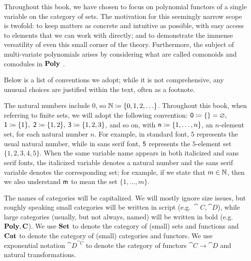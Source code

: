 \documentclass[Book-Poly]{subfiles}
\begin{document}
Throughout this book, we have chosen to focus on polynomial functors of a single variable on the category of sets.
The motivation for this seemingly narrow scope is twofold: to keep matters as concrete and intuitive as possible, with easy access to elements that we can work with directly; and to demonstrate the immense versatility of even this small corner of the theory. Furthermore, the subject of multi-variate polynomials arises by considering what are called comonoids and comodules in $\mathbf{Poly}$ \cite{spivak2023functorial}.


Below is a list of conventions we adopt; while it is not comprehensive, any unusual choices are justified within the text, often as a footnote.

The natural numbers include $0$, so $\mathbb{N}\coloneqq\{0,1,2,\ldots\}$. Throughout this book, when referring to finite sets, we will adopt the following convention: $\textsf{0}\coloneqq\{\}=\varnothing,$ $\textsf{1}\coloneqq\{1\},$ $\textsf{2}\coloneqq\{1,2\},$ $\textsf{3}\coloneqq\{1,2,3\}$, and so on, with $\mathsf{n}\coloneqq\{1,\ldots,n\}$, an $n$-element set, for each natural number $n$.
For example, in standard font, $5$ represents the usual natural number, while in sans serif font, $\textsf{5}$ represents the $5$-element set $\{1,2,3,4,5\}$.
When the same variable name appears in both italicized and sans serif fonts, the italicized variable denotes a natural number and the sans serif variable denotes the corresponding set; for example, if we state that $m\in\mathbb{N}$, then we also understand $\mathsf{m}$ to mean the set $\{1,\ldots,m\}$.


The names of categories will be capitalized.
We will mostly ignore size issues, but roughly speaking small categories will be written in script (e.g.$\ \cat{C}, \cat{D}$), while large categories (usually, but not always, named) will be written in bold (e.g.\ $\mathbf{Poly}, \mathbf{C}$).
We use $\mathbf{Set}$ to denote the category of (small) sets and functions and $\mathbf{Cat}$ to denote the category of (small) categories and functors.
We use exponential notation $\cat{D}^{\cat{C}}$ to denote the category of functors $\cat{C}\to\cat{D}$ and natural transformations.
\end{document}
